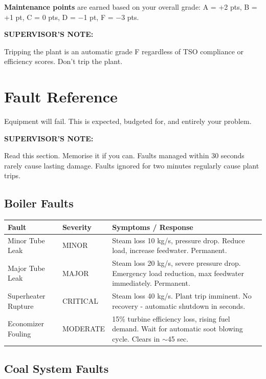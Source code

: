 \documentclass[10pt,a5paper]{article}
\newenvironment{notebox}{%
  \vspace{4pt}%
  \textbf{SUPERVISOR'S NOTE:} \bfseries%
}{%
}
\begin{document}
\textbf{Maintenance points} are earned based on your overall grade: A = +2 pts,
B = +1 pt, C = 0 pts, D = $-$1 pt, F = $-$3 pts.

\begin{notebox}
Tripping the plant is an automatic grade F regardless of TSO compliance or
efficiency scores. Don't trip the plant.
\end{notebox}

\section{Fault Reference}

Equipment will fail. This is expected, budgeted for, and entirely your problem.

\begin{notebox}
Read this section. Memorise it if you can. Faults managed within 30 seconds
rarely cause lasting damage. Faults ignored for two minutes regularly cause
plant trips.
\end{notebox}

\subsection{Boiler Faults}

\begin{center}
\begin{tabularx}{\linewidth}{p{2cm}lX}
\toprule
\textbf{Fault} & \textbf{Severity} & \textbf{Symptoms / Response} \\
\midrule
Minor Tube Leak    & MINOR    & Steam loss 10 kg/s, pressure drop. Reduce load, increase feedwater. Permanent. \\[4pt] \hline
Major Tube Leak    & MAJOR    & Steam loss 20 kg/s, severe pressure drop. Emergency load reduction, max feedwater immediately. Permanent. \\[4pt] \hline
Superheater Rupture & CRITICAL & Steam loss 40 kg/s. Plant trip imminent. No recovery - automatic shutdown in seconds. \\[4pt] \hline
Economizer Fouling & MODERATE & 15\% turbine efficiency loss, rising fuel demand. Wait for automatic soot blowing cycle. Clears in $\sim$45 sec. \\ %
\bottomrule
\end{tabularx}
\end{center}

\subsection{Coal System Faults}
\end{document}
